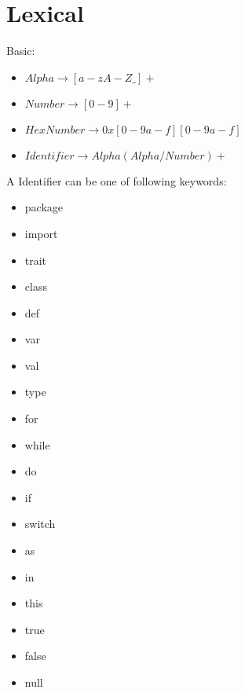 \section{Lexical}
Basic:

\begin{itemize}
\item $Alpha \rightarrow [a-zA-Z\_]+$
\item $Number \rightarrow [0-9]+$
\item $HexNumber \rightarrow 0x[0-9a-f][0-9a-f]$
\item $Identifier \rightarrow Alpha (Alpha / Number)+$
\end{itemize}

A Identifier can be one of following keywords:
\begin{multicols}{4}
\begin{itemize}
\item package 
\item import
\item trait 
\item class 
\item def 
\item var 
\item val 
\item type 
\item for 
\item while 
\item do 
\item if 
\item switch 
\item as
\item in
\item this
\item true
\item false
\item null
\end{itemize}
\end{multicols}

